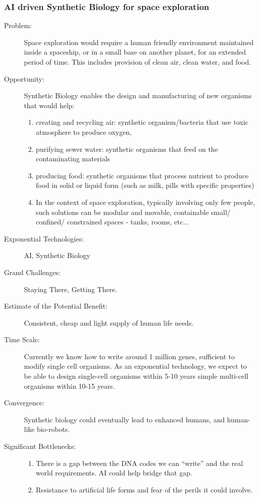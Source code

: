 \subsubsection{AI driven Synthetic Biology for space exploration} 
\begin{description}
\item[Problem:]
Space exploration would require a  human friendly environment maintained inside a spaceship, or in a small  base on another planet, for an extended period of time. This includes  provision of clean air, clean water, and food.
 
\item[Opportunity:]
Synthetic Biology enables the design and  manufacturing of new organisms that 
would  help:
\hfill\begin{enumerate}
\item creating and recycling air:  synthetic organism/bacteria that use toxic atmosphere to produce oxygen,
\item purifying sewer water: synthetic  organisms that feed on the contaminating materials
\item producing food: synthetic  organisms that process nutrient to produce food in solid or liquid form  (such as milk, pills with specific properties)
\item In the context of space  exploration, typically involving only few people, such solutions can be  modular and movable, containable small/ confined/ constrained spaces -  tanks, rooms, etc...
\end{enumerate}
 
\item[Exponential  Technologies:]  AI, Synthetic Biology
\item[Grand  Challenges:] Staying  There, Getting There.
\item  [Estimate of the Potential Benefit:] Consistent, cheap and light supply  of human life needs.
\item[Time  Scale:] 
Currently we know how to write  around 1 million genes, sufficient to modify single cell organisms. As  an exponential technology, we expect to be able to design single-cell  organisms within 5-10 years simple multi-cell organisms within 10-15  years. 
\item[Convergence:]
Synthetic biology could eventually  lead to enhanced humans, and human-like bio-robots.
\item[Significant  Bottlenecks:]
\hfill\begin{enumerate}
\item There is a gap between the  DNA codes we can ``write'' and the real world requirements. AI could help  bridge that gap.
\item Resistance to artificial  life forms and fear of the perils it could involve.
\end{enumerate}
\end{description}
 
